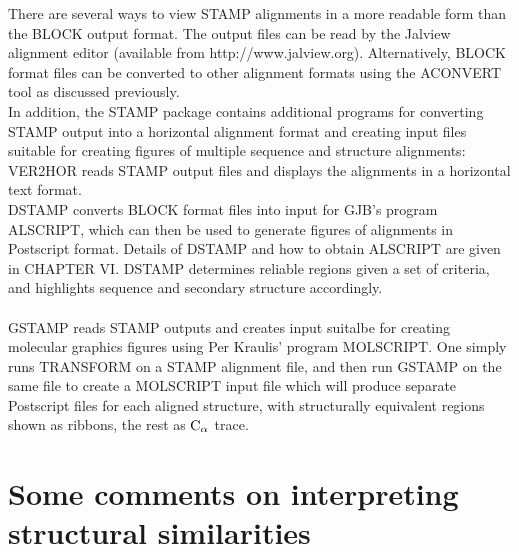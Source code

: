 There are several ways to view STAMP alignments in a more readable
form than the BLOCK output format. The output files can be read by
the Jalview alignment editor (available from http://www.jalview.org). 
Alternatively, BLOCK format files can be converted to other alignment
formats using the ACONVERT tool as discussed previously.
\\
In addition, the STAMP package contains additional programs for
converting STAMP output into a horizontal alignment format and
creating input files suitable for creating figures of
multiple sequence and structure alignments:
\\
VER2HOR reads STAMP output files and displays the alignments in a horizontal text
format.
\\
DSTAMP converts BLOCK format files
into input for GJB's program ALSCRIPT, which can then be used to generate figures
of alignments in Postscript format. Details of DSTAMP and how to obtain
ALSCRIPT are given in CHAPTER VI. DSTAMP determines reliable regions given a set of criteria, and
highlights sequence and secondary structure accordingly.\\
\\
GSTAMP reads STAMP outputs and creates input suitalbe for creating
molecular graphics figures using Per Kraulis' program MOLSCRIPT. 
One simply runs TRANSFORM on a STAMP alignment file, and then run GSTAMP on the same file
to create a MOLSCRIPT input file which will produce separate Postscript files
for each aligned structure, with structurally equivalent regions
shown as ribbons, the rest as ${\rm C}_{\alpha}$ trace.
\\


\section{Some comments on interpreting structural similarities}

